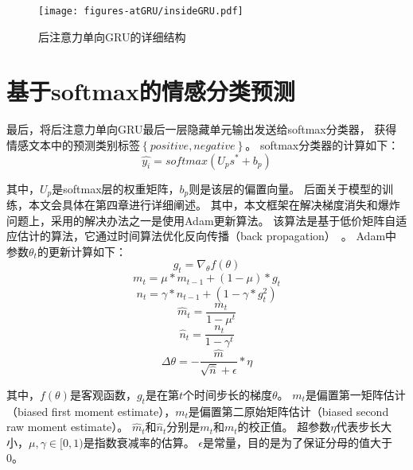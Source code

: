 \begin{figure}[h!]
    \centering
    \texttt{[image: figures-atGRU/insideGRU.pdf]}
    \caption{后注意力单向GRU的详细结构}
    \label{fig:insideGRU}
\end{figure}

\section{基于softmax的情感分类预测}
最后，将后注意力单向GRU最后一层隐藏单元输出发送给softmax分类器，
获得情感文本中的预测类别标签${\left\{positive,negative\right\}}$。
softmax分类器的计算如下：
\begin{equation}
    \widehat{y_{i}}=softmax\left ( U_{p}s^{*}+b_{p} \right )
\end{equation}

其中，${U_{p}}$是softmax层的权重矩阵，${b_{p}}$则是该层的偏置向量。
后面关于模型的训练，本文会具体在第四章进行详细阐述。
其中，本文框架在解决梯度消失和爆炸问题上，采用的解决办法之一是使用Adam更新算法。
该算法是基于低价矩阵自适应估计的算法，它通过时间算法优化反向传播（back propagation）~。
Adam中参数${\theta_{t}}$的更新计算如下：
\begin{equation}
    g_{t}=\nabla_{\theta }f\left ( \theta \right )
\end{equation}
\begin{equation}
    m_{t}=\mu \ast m_{t-1} +\left ( 1-\mu \right ) \ast g_{t}
\end{equation}
\begin{equation}
    n_{t}=\gamma  \ast n_{t-1} +\left ( 1-\gamma  \ast g_{t} ^{2} \right )
\end{equation}
\begin{equation}
    \widehat{m}_{t}=\frac{m_{t}}{1-\mu ^{t}}
\end{equation}
\begin{equation}
    \widehat{n}_{t}=\frac{n_{t}}{1-\gamma  ^{t}}
\end{equation}
\begin{equation}
    \Delta \theta =-\frac{\widehat{m}}{\sqrt{\widehat{n}}+\epsilon }\ast \eta
\end{equation}

其中，${f\left ( \theta \right )}$是客观函数，${g_{t}}$是在第${t}$个时间步长的梯度${\theta}$。
${m_{t}}$是偏置第一矩阵估计（biased first moment estimate），${m_{t}}$是偏置第二原始矩阵估计（biased second raw moment estimate）。
${\widehat{m}_{t}}$和${\widehat{n}_{t}}$分别是${m_{t}}$和${m_{t}}$的校正值。
超参数${\eta}$代表步长大小，${\mu,\gamma \in [0,1)}$是指数衰减率的估算。
${\epsilon}$是常量，目的是为了保证分母的值大于0。

